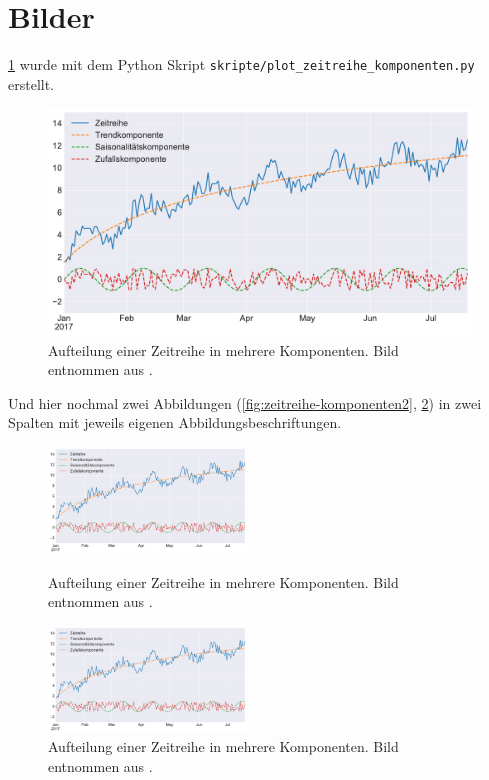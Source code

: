 \section{Bilder}

\ref{fig:zeitreihe-komponenten} wurde mit dem Python Skript \verb|skripte/plot_zeitreihe_komponenten.py| erstellt.

\begin{figure}[h]
  \centering
  \includegraphics[width=\textwidth]{bilder/02-hauptteil/zeitreihe-komponenten.pdf}
  \caption[Aufteilung einer Zeitreihe in mehrere Komponenten]{Aufteilung einer Zeitreihe in mehrere Komponenten. Bild entnommen aus \citet{Masterthesis.2017}.}
  \label{fig:zeitreihe-komponenten}
\end{figure}

Und hier nochmal zwei Abbildungen (\ref{fig:zeitreihe-komponenten2}, \ref{fig:zeitreihe-komponenten3}) in zwei Spalten mit jeweils eigenen Abbildungsbeschriftungen.

\begin{figure}[ht]
  \parbox{.47\textwidth}{
    \includegraphics[width=0.47\textwidth]{bilder/02-hauptteil/zeitreihe-komponenten.pdf}
    \caption[Aufteilung einer Zeitreihe in mehrere Komponenten]{Aufteilung einer Zeitreihe in mehrere Komponenten. Bild entnommen aus \citet{Masterthesis.2017}.}
    \label{fig:zeitreihe-komponenten2}
  }
  \hfill
  \parbox{.47\textwidth}{
    \includegraphics[width=0.47\textwidth]{bilder/02-hauptteil/zeitreihe-komponenten.pdf}
    \caption[Aufteilung einer Zeitreihe in mehrere Komponenten]{Aufteilung einer Zeitreihe in mehrere Komponenten. Bild entnommen aus \citet{Masterthesis.2017}.}
    \label{fig:zeitreihe-komponenten3}
  }
\end{figure}
